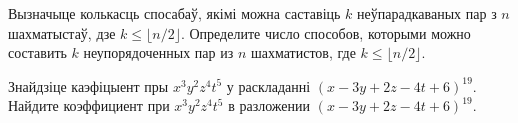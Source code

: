 \begin{problemList}
\problemItemSimple
{Вызначыце колькасць спосабаў, якімі можна саставіць $k$ неўпарадкаваных
пар з $n$ шахматыстаў, дзе $k \le \lfloor n/2\rfloor$.}
{Определите число способов, которыми можно составить $k$ неупорядоченных
пар из $n$ шахматистов, где $k \le \lfloor n/2\rfloor$.}

\problemItemSimple
{Знайдзіце каэфіцыент пры $x^3y^2z^4t^5$ у раскладанні $(x - 3y + 2z - 4t + 6)^{19}$.}
{Найдите коэффициент при $x^3y^2z^4t^5$ в разложении $(x - 3y + 2z - 4t + 6)^{19}$.}

\end{problemList}


